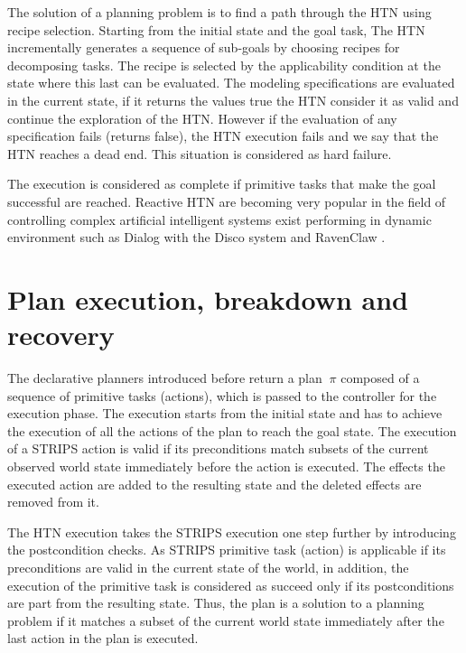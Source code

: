 \par The solution of a planning problem is to find a path through the HTN using recipe selection. Starting from the initial state and the goal task, The HTN incrementally generates a sequence of sub-goals by choosing recipes for decomposing tasks. The recipe is selected by the applicability condition at the state where this last can be evaluated. The modeling specifications are evaluated in the current state, if it returns the values true the HTN consider it as valid and continue the exploration of the HTN. However if the evaluation of any specification fails (returns false), the
HTN execution fails and we say that the HTN reaches a dead end. This situation is considered as hard failure. 

The execution is considered as complete if primitive tasks that make the goal successful are reached. Reactive HTN are becoming very popular in the field of controlling complex artificial intelligent systems exist performing in dynamic environment such as Dialog with the Disco system \cite{rich2009building} and RavenClaw \cite{bohus2003ravenclaw}.

\section{Plan execution, breakdown and recovery}
The declarative planners introduced before return a plan $\ \pi $ composed of a sequence of primitive tasks (actions), which is passed to the controller for the execution phase. The execution starts from the initial state and has to achieve the execution
of all the actions of the plan to reach the goal state. The execution of a STRIPS action is valid if its preconditions match subsets of the current observed world state immediately before the action is executed. The effects the executed action are added to the resulting state and the deleted effects are removed from it.

\par The HTN execution takes the STRIPS execution one step further by introducing the postcondition checks. As STRIPS primitive task (action) is applicable if its preconditions are valid in the current state of the world, in addition, the execution of the primitive task is considered as succeed only if its postconditions are part from the resulting state. Thus, the plan is a solution to a planning problem if it matches a subset of the current world state immediately after the last action in the plan is executed.


